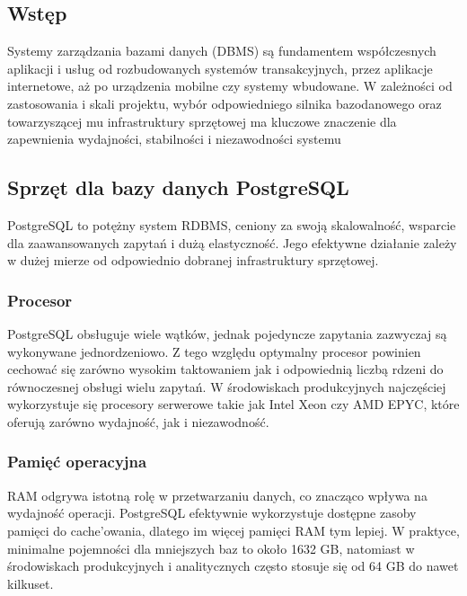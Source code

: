 \documentclass[letterpaper,10pt,polish]{sphinxmanual}
\begin{document}
\subsection{Wstęp}
\label{\detokenize{rozdzial2/Sprzet-dla-bazy-danych/source/SprzetDlaBazyDanych:wstep}}
\sphinxAtStartPar
Systemy zarządzania bazami danych (DBMS) są fundamentem współczesnych aplikacji i usług \textendash{} od rozbudowanych systemów transakcyjnych, przez aplikacje internetowe, aż po urządzenia mobilne czy systemy wbudowane. W zależności od zastosowania i skali projektu, wybór odpowiedniego silnika bazodanowego oraz towarzyszącej mu infrastruktury sprzętowej ma kluczowe znaczenie dla zapewnienia wydajności, stabilności i niezawodności systemu


\subsection{Sprzęt dla bazy danych PostgreSQL}
\label{\detokenize{rozdzial2/Sprzet-dla-bazy-danych/source/SprzetDlaBazyDanych:sprzet-dla-bazy-danych-postgresql}}
\sphinxAtStartPar
PostgreSQL to potężny system RDBMS, ceniony za swoją skalowalność, wsparcie dla zaawansowanych zapytań i dużą elastyczność. Jego efektywne działanie zależy w dużej mierze od odpowiednio dobranej infrastruktury sprzętowej.


\subsubsection{Procesor}
\label{\detokenize{rozdzial2/Sprzet-dla-bazy-danych/source/SprzetDlaBazyDanych:procesor}}
\sphinxAtStartPar
PostgreSQL obsługuje wiele wątków, jednak pojedyncze zapytania zazwyczaj są wykonywane jednordzeniowo. Z tego względu optymalny procesor powinien cechować się zarówno wysokim taktowaniem jak i odpowiednią liczbą rdzeni do równoczesnej obsługi wielu zapytań. W środowiskach produkcyjnych najczęściej wykorzystuje się procesory serwerowe takie jak Intel Xeon czy AMD EPYC, które oferują zarówno wydajność, jak i niezawodność.


\subsubsection{Pamięć operacyjna}
\label{\detokenize{rozdzial2/Sprzet-dla-bazy-danych/source/SprzetDlaBazyDanych:pamiec-operacyjna}}
\sphinxAtStartPar
RAM odgrywa istotną rolę w przetwarzaniu danych, co znacząco wpływa na wydajność operacji. PostgreSQL efektywnie wykorzystuje dostępne zasoby pamięci do cache’owania, dlatego im więcej pamięci RAM tym lepiej. W praktyce, minimalne pojemności dla mniejszych baz to około 16\textendash{}32 GB, natomiast w środowiskach produkcyjnych i analitycznych często stosuje się od 64 GB do nawet kilkuset.
\end{document}
